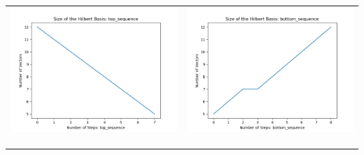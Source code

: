 \documentclass[10pt]{article}
\begin{document}
\begin{tabular}{c|c}
\begin{minipage}{.45\textwidth}
\includegraphics[width=\textwidth]{"DATA/5d/5 generators 2 bound J/top_sequence SIZE"}
\end{minipage} &
\begin{minipage}{.45\textwidth}
\includegraphics[width=\textwidth]{"DATA/5d/5 generators 2 bound J bottomup/bottom_sequence SIZE"}
\end{minipage} \\ \\
\hline \\\begin{minipage}{.45\textwidth}

\end{minipage}
\end{tabular}
\end{document}
